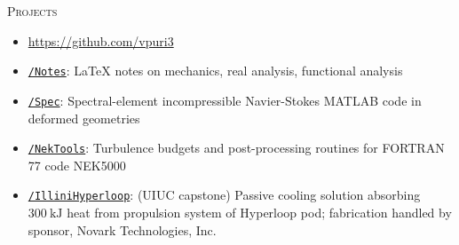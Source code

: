 \documentclass[10pt]{article}
\begin{document}
\begin{multicols}{2}
\textsc{Projects}
\columnbreak

\vspace{-1.75em}
\begin{itemize}[label=-]
    \setlength{\itemindent}{-1.50em}
    \setlength\itemsep{-0.25em}
    \item[]\hspace{-1.00em}\url{https://github.com/vpuri3}
    \item \href{https://github.com/vpuri3/Notes}{\texttt{/Notes}}: \LaTeX{} notes on mechanics, real analysis, functional analysis
    \item \href{https://github.com/vpuri3/Spec}{\texttt{/Spec}}: Spectral-element incompressible Navier-Stokes MATLAB code in deformed geometries
    \item \href{https://github.com/vpuri3/NekTools}{\texttt{/NekTools}}: Turbulence budgets and post-processing routines for FORTRAN 77 code {NEK5000}
    \item \href{https://github.com/vpuri3/IlliniHyperloop}{\texttt{/IlliniHyperloop}}: (UIUC capstone) Passive cooling solution absorbing $\SI{300}{\kilo \joule}$ heat from propulsion system of Hyperloop pod; fabrication handled by sponsor, Novark Technologies, Inc.
\end{itemize}
\vspace{-2.0em}

\end{multicols}
\vspace{-1.5em}
\vfill
\end{document}
